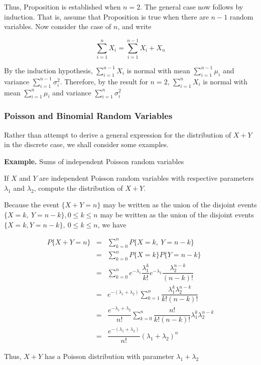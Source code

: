 $ $

Thus, Proposition  is established when $n = 2$. The general case now follows by induction. That is, assume that Proposition is true when there are $n - 1$ random variables. Now consider the case of $n$, and write

$$\sum^n_{i = 1}X_i = \sum^{n - 1}_{i = 1}X_i + X_n$$

By the induction hypothesis, $\sum_{i = 1}^{n -1}X_i$ is normal with mean $\sum^{n -1}_{i = 1}\mu_i$ and variance $\sum^{n - 1}_{i = 1}\sigma_i^2$. Therefore, by the result for $n = 2$, $\sum^n_{i = 1}X_i$ is normal with mean $\sum^n_{i = 1}\mu_i$ and variance $\sum^n_{i = 1}\sigma_i^2$

\subsubsection*{Poisson and Binomial Random Variables}

Rather than attempt to derive a general expression for the distribution of $X + Y$ in the discrete case, we shall consider some examples.

\textbf{Example.} Sums of independent Poisson random variables

If $X$ and $Y$ are independent Poisson random variables with respective parameters $\lambda_1$ and $\lambda_2$, compute the distribution of $X + Y$.

\begin{solution}
	Because the event $\{X + Y = n\}$ may be written as the union of the disjoint events $\{X = k,~Y = n-k\},0\leq k \leq n$ may be written as the union of the disjoint events $\{X = k,Y = n - k\},~ 0 \leq k \leq n$, we have
	
	\begin{eqnarray*}
		P\{X + Y = n\} &=& \sum^n_{k = 0}P\{X = k,~Y = n-k\}\\
		& = &\sum^n_{k = 0}P\{X = k\}P\{Y = n - k\}\\
		& = &\sum^n_{k = 0}e^{-\lambda_1}\dfrac{\lambda_1^k}{k!}e^{-\lambda_2}\dfrac{\lambda_2^{n - k}}{(n - k)!}\\
		& = &e^{-(\lambda_1 + \lambda_2)} \sum^n_{k = 1}\dfrac{\lambda_1^k\lambda^{n - k}_2}{k!(n - k)!}\\
		& = & \dfrac{e^{-\lambda_1 + \lambda_2}}{n!}\sum^n_{k = 0}\dfrac{n!}{k!(n - k)!}\lambda_1^k\lambda_2^{n - k}\\
		& = &\dfrac{e^{- ( \lambda_1 + \lambda_2)}}{n!}(\lambda_1 + \lambda_2)^n
	\end{eqnarray*}
	
	Thus, $X + Y$ has a Poisson distribution with parameter $\lambda_1 + \lambda_2$
\end{solution}

